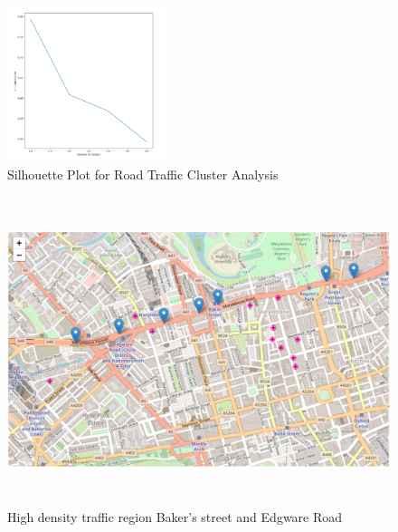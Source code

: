 \documentclass[a4paper, 11pt]{article}
\begin{document}
\begin{figure}[H]
    \begin{center}
      \includegraphics[height=4.5cm, scale=0.01,keepaspectratio]{silhouette-score-traffic.png}
      \caption{Silhouette Plot for Road Traffic Cluster Analysis}
    \end{center}
\end{figure}

\begin{figure}[H]
    \begin{center}
      \includegraphics[height=9cm, width=20cm,keepaspectratio]{traffic-bakers-street.png}
      \caption{High density traffic region Baker's street and Edgware Road}
    \end{center}
\end{figure}
\end{document}
